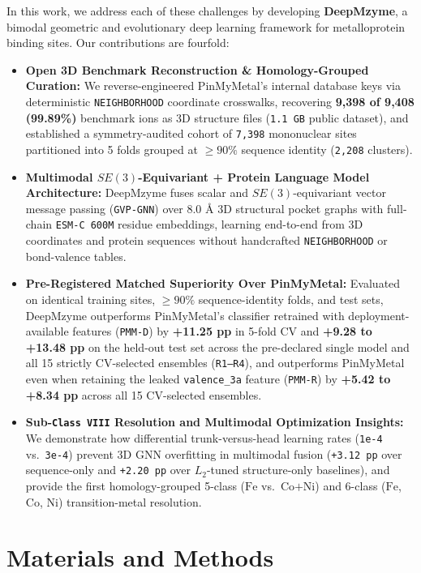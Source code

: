 \documentclass[10pt,a4paper,twocolumn]{article}
\begin{document}
In this work, we address each of these challenges by developing \textbf{DeepMzyme}, a bimodal geometric and evolutionary deep learning framework for metalloprotein binding sites. Our contributions are fourfold:
\begin{itemize}
  \item \textbf{Open 3D Benchmark Reconstruction \& Homology-Grouped Curation:} We reverse-engineered PinMyMetal's internal database keys via deterministic \texttt{NEIGHBORHOOD} coordinate crosswalks, recovering \textbf{9,398 of 9,408 (99.89\%)} benchmark ions as 3D structure files (\texttt{1.1 GB} public dataset), and established a symmetry-audited cohort of \texttt{7,398} mononuclear sites partitioned into 5 folds grouped at $\ge 90\%$ sequence identity (\texttt{2,208} clusters).
  \item \textbf{Multimodal $SE(3)$-Equivariant + Protein Language Model Architecture:} DeepMzyme fuses scalar and $SE(3)$-equivariant vector message passing (\texttt{GVP-GNN}) \cite{jing2021gvp} over $8.0\text{ \AA}$ 3D structural pocket graphs with full-chain \texttt{ESM-C 600M} \cite{esmc2024} residue embeddings, learning end-to-end from 3D coordinates and protein sequences without handcrafted \texttt{NEIGHBORHOOD} or bond-valence tables.
  \item \textbf{Pre-Registered Matched Superiority Over PinMyMetal:} Evaluated on identical training sites, $\ge 90\%$ sequence-identity folds, and test sets, DeepMzyme outperforms PinMyMetal's classifier retrained with deployment-available features (\texttt{PMM-D}) by \textbf{+11.25 pp} in 5-fold CV and \textbf{+9.28 to +13.48 pp} on the held-out test set across the pre-declared single model and all 15 strictly CV-selected ensembles (\texttt{R1--R4}), and outperforms PinMyMetal even when retaining the leaked \texttt{valence\_3a} feature (\texttt{PMM-R}) by \textbf{+5.42 to +8.34 pp} across all 15 CV-selected ensembles.
  \item \textbf{Sub-\texttt{Class VIII} Resolution and Multimodal Optimization Insights:} We demonstrate how differential trunk-versus-head learning rates (\texttt{1e-4} vs.\ \texttt{3e-4}) prevent 3D GNN overfitting in multimodal fusion (\texttt{+3.12 pp} over sequence-only and \texttt{+2.20 pp} over $L_2$-tuned structure-only baselines), and provide the first homology-grouped 5-class ($\text{Fe}$ vs.\ $\text{Co+Ni}$) and 6-class ($\text{Fe}$, $\text{Co}$, $\text{Ni}$) transition-metal resolution.
\end{itemize}

\section{Materials and Methods}
\end{document}
